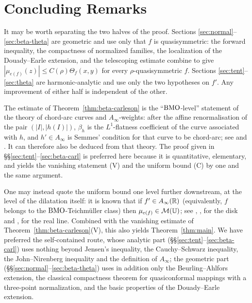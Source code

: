 \section{Concluding Remarks}\label{sec:concl}

\begin{remark}
	It may be worth separating the two halves of the proof. Sections
	\ref{sec:normal}--\ref{sec:beta-theta} are geometric and use only that $f$ is
	quasisymmetric: the forward inequality, the compactness of normalized families,
	the localization of the Douady--Earle extension, and the telescoping estimate
	combine to give $|\mu_{e(f)}(z)|\le C(\rho)\Theta_f(x,y)$ for every
	$\rho$-quasisymmetric $f$. Sections \ref{sec:tent}--\ref{sec:theta} are
	harmonic-analytic and use only the two hypotheses on $f'$. Any improvement of
	either half is independent of the other.
\end{remark}

\begin{remark}
	The estimate of Theorem~\ref{thm:beta-carleson} is the ``$\mathrm{BMO}$-level''
	statement of the theory of chord-arc curves and $A_\infty$-weights: after the
	affine renormalisation of the pair $(|I|,|h(I)|)$, $\beta_h$ is the
	$L^1$-flatness coefficient of the curve associated with $h$, and $h'\in
	A_\infty$ is Semmes' condition for that curve to be chord-arc; see \cite{Se}
	and \cite[Ch.~I]{DS}. It can therefore also be deduced from that theory. The
	proof given in \S\S\ref{sec:tent}--\ref{sec:beta-carl} is preferred here
	because it is quantitative, elementary, and yields the vanishing statement (V)
	and the uniform bound (C) by one and the same argument.
\end{remark}

\begin{remark}
	One may instead quote the uniform bound one level further downstream, at the
	level of the dilatation itself: it is known that if $f'\in A_\infty(\mathbb{R})$
	(equivalently, $f$ belongs to the $\mathrm{BMO}$-Teichm\"uller class) then
	$\mu_{e(f)}\in\mathcal{M}(\mathbb{U})$; see \cite{Cu}, \cite{SW}, \cite{TWS} for the disk and
	\cite{Sh}, \cite{WM3} for the real line. Combined with the vanishing estimate
	of Theorem~\ref{thm:beta-carleson}(V), this also yields
	Theorem~\ref{thm:main}. We have preferred the self-contained route, whose analytic
	part (\S\S\ref{sec:tent}--\ref{sec:beta-carl}) uses nothing beyond Jensen's
	inequality, the Cauchy--Schwarz inequality, the John--Nirenberg inequality and
	the definition of $A_\infty$; the geometric part
	(\S\S\ref{sec:normal}--\ref{sec:beta-theta}) uses in addition only the
	Beurling--Ahlfors extension, the classical compactness theorem for
	quasiconformal mappings with a three-point normalization, and the basic
	properties of the Douady--Earle extension.
\end{remark}

